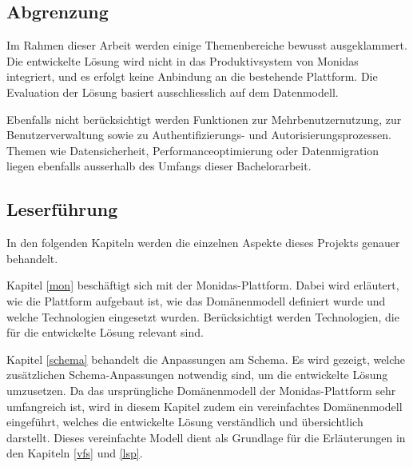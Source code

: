 \subsection{Abgrenzung}


Im Rahmen dieser Arbeit werden einige Themenbereiche bewusst ausgeklammert. Die entwickelte Lösung wird nicht in das Produktivsystem von Monidas integriert, und es erfolgt keine Anbindung an die bestehende Plattform. Die Evaluation der Lösung basiert ausschliesslich auf dem Datenmodell.

Ebenfalls nicht berücksichtigt werden Funktionen zur Mehrbenutzernutzung, zur Benutzerverwaltung sowie zu Authentifizierungs- und Autorisierungsprozessen. Themen wie Datensicherheit, Performanceoptimierung oder Datenmigration liegen ebenfalls ausserhalb des Umfangs dieser Bachelorarbeit.

\subsection{Leserführung}
In den folgenden Kapiteln werden die einzelnen Aspekte dieses Projekts genauer behandelt.
 
Kapitel \ref{mon} beschäftigt sich mit der Monidas-Plattform. Dabei wird erläutert, wie die Plattform aufgebaut ist, wie das Domänenmodell definiert wurde und welche Technologien eingesetzt wurden. Berücksichtigt werden Technologien, die für die entwickelte Lösung relevant sind.

Kapitel \ref{schema} behandelt die Anpassungen am Schema. Es wird gezeigt, welche zusätzlichen Schema-Anpassungen notwendig sind, um die entwickelte Lösung umzusetzen. Da das ursprüngliche Domänenmodell der Monidas-Plattform sehr umfangreich ist, wird in diesem Kapitel zudem ein vereinfachtes Domänenmodell eingeführt, welches die entwickelte Lösung verständlich und übersichtlich darstellt. Dieses vereinfachte Modell dient als Grundlage für die Erläuterungen in den Kapiteln \ref{vfs} und \ref{lsp}.

